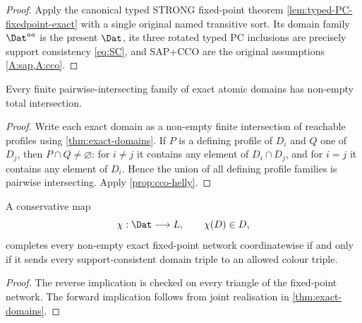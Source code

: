 \begin{proof}
Apply the canonical typed STRONG fixed-point theorem
\cref{lem:typed-PC-fixedpoint-exact}
with a single original named transitive sort.
Its domain family $\Dat^{aa}$ is the present
$\Dat$, its three rotated typed PC inclusions
are precisely support consistency
\eqref{eq:SC}, and SAP+CCO are the original
assumptions \cref{A:sap,A:cco}.
\end{proof}

\begin{corollary}\label{cor:exact-domain-helly}
Every finite pairwise-intersecting family of exact atomic domains has
non-empty total intersection.
\end{corollary}

\begin{proof}
Write each exact domain as a non-empty finite intersection of reachable
profiles using \cref{thm:exact-domains}.  If \(P\) is a defining profile of
\(D_i\) and \(Q\) one of \(D_j\), then \(P\cap Q\neq\varnothing\): for
\(i\neq j\) it contains any element of \(D_i\cap D_j\), and for \(i=j\) it
contains any element of \(D_i\).  Hence the union of all defining profile
families is pairwise intersecting.  Apply \cref{prop:cco-helly}.
\end{proof}

\begin{corollary}\label{cor:selector-interface}
A conservative map
\[
 \chi:\Dat\longrightarrow L,
 \qquad \chi(D)\in D,
\]
completes every non-empty exact fixed-point network coordinatewise if and only
if it sends every support-consistent domain triple to an allowed colour
triple.
\end{corollary}

\begin{proof}
The reverse implication is checked on every triangle of the fixed-point
network.  The forward implication follows from joint realisation in
\cref{thm:exact-domains}.
\end{proof}

